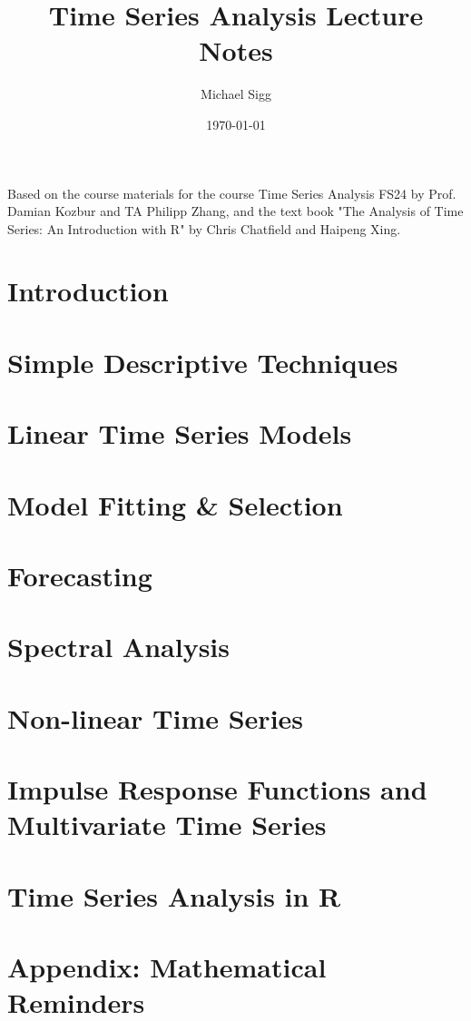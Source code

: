 \documentclass[11pt]{article}
\title{Time Series Analysis Lecture Notes}
\author{Michael Sigg}
\date{\today}
\begin{document}
\maketitle
\begin{center}
    Based on the course materials for the course Time Series Analysis FS24 by Prof. Damian Kozbur and TA Philipp Zhang, and the text book "The Analysis of Time Series: An Introduction with R" by Chris Chatfield and Haipeng Xing.
\end{center}
\tableofcontents

\newpage

\section{Introduction}


\section{Simple Descriptive Techniques}


\section{Linear Time Series Models}


\section{Model Fitting \& Selection}


\section{Forecasting}


\section{Spectral Analysis}


\section{Non-linear Time Series}


\section{Impulse Response Functions and Multivariate Time Series}


\newpage
\section{Time Series Analysis in R}


\newpage
\section{Appendix: Mathematical Reminders}

\end{document}
